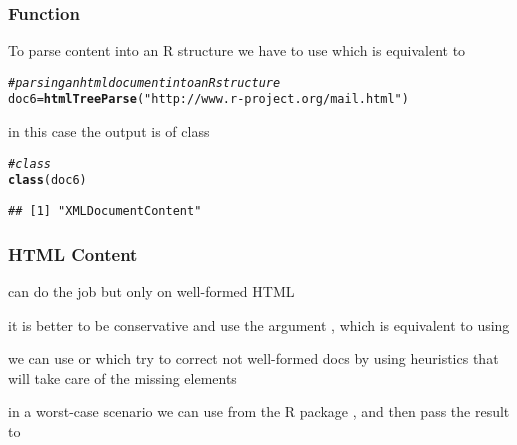 \documentclass[12pt]{beamer}\usepackage[]{graphicx}\usepackage[]{color}
\makeatletter
\newcommand{\hlstr}[1]{\textcolor[rgb]{0.192,0.494,0.8}{#1}}%
\newcommand{\hlcom}[1]{\textcolor[rgb]{0.678,0.584,0.686}{\textit{#1}}}%
\newcommand{\hlstd}[1]{\textcolor[rgb]{0.345,0.345,0.345}{#1}}%
\newcommand{\hlkwb}[1]{\textcolor[rgb]{0.69,0.353,0.396}{#1}}%
\newcommand{\hlkwd}[1]{\textcolor[rgb]{0.737,0.353,0.396}{\textbf{#1}}}%
\newenvironment{kframe}{%
 \def\at@end@of@kframe{}%
 \ifinner\ifhmode%
  \def\at@end@of@kframe{\end{minipage}}%
  \begin{minipage}{\columnwidth}%
 \fi\fi%
 \def\FrameCommand##1{\hskip\@totalleftmargin \hskip-\fboxsep
 \colorbox{shadecolor}{##1}\hskip-\fboxsep
     \hskip-\linewidth \hskip-\@totalleftmargin \hskip\columnwidth}%
 \MakeFramed {\advance\hsize-\width
   \@totalleftmargin\z@ \linewidth\hsize
   \@setminipage}}%
 {\par\unskip\endMakeFramed%
 \at@end@of@kframe}
\newenvironment{knitrout}{}{} %
\makeatother
\begin{document}
\begin{frame}[fragile]
\frametitle{Function }

To parse content into an R structure we have to use {\hilit {}} which is equivalent to 

\begin{knitrout}\footnotesize
{}\color{fgcolor}\begin{kframe}
\begin{alltt}
\hlcom{# parsing an html document into an  R structure}
\hlstd{doc6} \hlkwb{=} \hlkwd{htmlTreeParse}\hlstd{(}\hlstr{"http://www.r-project.org/mail.html"}\hlstd{)}
\end{alltt}
\end{kframe}
\end{knitrout}

in this case the output is of class {\hilit {}}

\begin{knitrout}\footnotesize
{}\color{fgcolor}\begin{kframe}
\begin{alltt}
\hlcom{# class }
\hlkwd{class}\hlstd{(doc6)}
\end{alltt}
\begin{verbatim}
## [1] "XMLDocumentContent"
\end{verbatim}
\end{kframe}
\end{knitrout}
\eb

\end{frame}


\begin{frame}[fragile]
\frametitle{HTML Content}

\bi
 \item {} can do the job but only on well-formed HTML
 \item it is better to be conservative and use the argument {\hilit {}}, which is equivalent to using 
 \item we can use {\hilit {}} or {\hilit {}} which try to correct not well-formed docs by using heuristics that will take care of the missing elements
 \item in a worst-case scenario we can use {\hilit {}} from the R package , and then pass the result to 
\ei
\eb

\end{frame}
\end{document}
